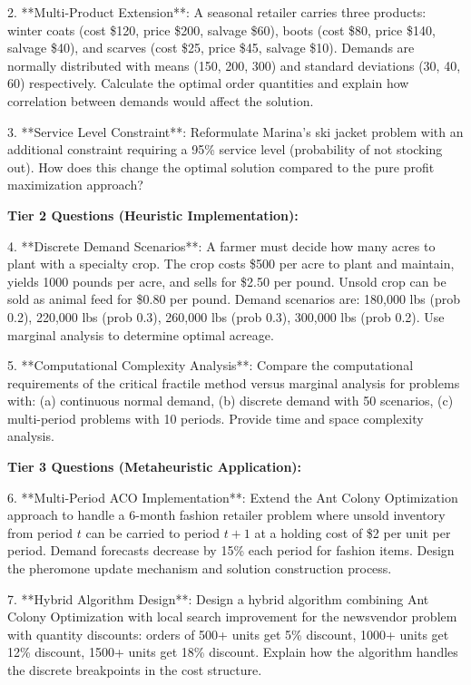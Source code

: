 \documentclass{article}
\begin{document}
2. **Multi-Product Extension**: A seasonal retailer carries three products: winter coats (cost \$120, price \$200, salvage \$60), boots (cost \$80, price \$140, salvage \$40), and scarves (cost \$25, price \$45, salvage \$10). Demands are normally distributed with means (150, 200, 300) and standard deviations (30, 40, 60) respectively. Calculate the optimal order quantities and explain how correlation between demands would affect the solution.

3. **Service Level Constraint**: Reformulate Marina's ski jacket problem with an additional constraint requiring a 95\% service level (probability of not stocking out). How does this change the optimal solution compared to the pure profit maximization approach?

\textbf{Tier 2 Questions (Heuristic Implementation):}

4. **Discrete Demand Scenarios**: A farmer must decide how many acres to plant with a specialty crop. The crop costs \$500 per acre to plant and maintain, yields 1000 pounds per acre, and sells for \$2.50 per pound. Unsold crop can be sold as animal feed for \$0.80 per pound. Demand scenarios are: 180,000 lbs (prob 0.2), 220,000 lbs (prob 0.3), 260,000 lbs (prob 0.3), 300,000 lbs (prob 0.2). Use marginal analysis to determine optimal acreage.

5. **Computational Complexity Analysis**: Compare the computational requirements of the critical fractile method versus marginal analysis for problems with: (a) continuous normal demand, (b) discrete demand with 50 scenarios, (c) multi-period problems with 10 periods. Provide time and space complexity analysis.

\textbf{Tier 3 Questions (Metaheuristic Application):}

6. **Multi-Period ACO Implementation**: Extend the Ant Colony Optimization approach to handle a 6-month fashion retailer problem where unsold inventory from period $t$ can be carried to period $t+1$ at a holding cost of \$2 per unit per period. Demand forecasts decrease by 15\% each period for fashion items. Design the pheromone update mechanism and solution construction process.

7. **Hybrid Algorithm Design**: Design a hybrid algorithm combining Ant Colony Optimization with local search improvement for the newsvendor problem with quantity discounts: orders of 500+ units get 5\% discount, 1000+ units get 12\% discount, 1500+ units get 18\% discount. Explain how the algorithm handles the discrete breakpoints in the cost structure.
\end{document}
